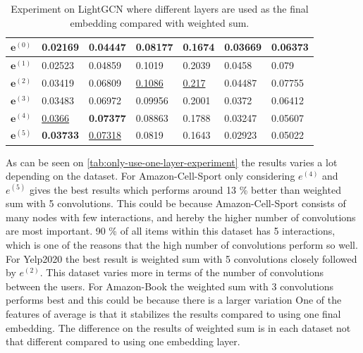 \begin{table}[]
\begin{tabular}{|l|l|l|l|l|l|l|}
        $\mathbf{e}^{(0)}$   & 0.02169                                & 0.04447                       & 0.08177                          & 0.1674            & 0.03669             & 0.06373             \\ \hline
        $\mathbf{e}^{(1)}$   & 0.02523                                & 0.04859                       & 0.1019                           & 0.2039            & 0.0458              & 0.079               \\ \hline
        $\mathbf{e}^{(2)}$   & 0.03419                                & 0.06809                       & \underline{0.1086}               & \underline{0.217} & 0.04487             & 0.07755             \\ \hline
        $\mathbf{e}^{(3)}$   & 0.03483                                & 0.06972                       & 0.09956                          & 0.2001            & 0.0372              & 0.06412             \\ \hline
        $\mathbf{e}^{(4)}$   & \underline{0.0366}                     & \textbf{0.07377}              & 0.08863                          & 0.1788            & 0.03247             & 0.05607             \\ \hline
        $\mathbf{e}^{(5)}$   & \textbf{0.03733}                       & \underline{0.07318}           & 0.0819                           & 0.1643            & 0.02923             & 0.05022             \\ \hline
    \end{tabular}
    \centering
    \caption{Experiment on LightGCN where different layers are used as the final embedding compared with weighted sum.}
    \label{tab:only-use-one-layer-experiment}
\end{table}

As can be seen on \autoref{tab:only-use-one-layer-experiment} the results varies a lot depending on the dataset.
For Amazon-Cell-Sport only considering $e^{(4)}$ and $e^{(5)}$ gives the best results which performs around 13 \% better than weighted sum with 5 convolutions.
This could be because Amazon-Cell-Sport consists of many nodes with few interactions, and hereby the higher number of convolutions are most important. 90 \% of all items within this dataset has 5 interactions, which is one of the reasons that the high number of convolutions perform so well.
For Yelp2020 the best result is weighted sum with 5 convolutions closely followed by $e^{(2)}$.
This dataset varies more in terms of the number of convolutions between the users.
For Amazon-Book the weighted sum with 3 convolutions performs best and this could be because there is a larger variation
One of the features of average is that it stabilizes the results compared to using one final embedding.
The difference on the results of weighted sum is in each dataset not that different compared to using one embedding layer.
